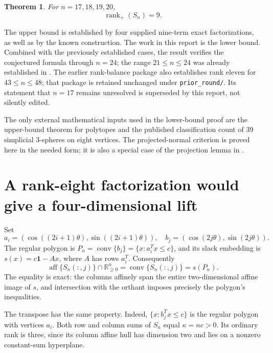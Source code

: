 \documentclass[11pt]{article}
\newtheorem{theorem}{Theorem}[section]
\theoremstyle{definition}
\newcommand{\rankp}{\operatorname{rank}_{+}}
\newcommand{\aff}{\operatorname{aff}}
\newcommand{\conv}{\operatorname{conv}}
\newcommand{\R}{\mathbb R}
\newcommand{\one}{\mathbf 1}
\begin{document}
\begin{theorem}\label{thm:main}
For $n=17,18,19,20$,
\[
 \boxed{\rankp(S_n)=9.}
\]
\end{theorem}
The upper bound is established by four supplied nine-term exact factorizations, as well as by the known construction. The work in this report is the lower bound. Combined with the previously established cases, the result verifies the conjectured formula through $n=24$; the range $21\le n\le24$ was already established in \cite{vgg}. The earlier rank-balance package also establishes rank eleven for $43\le n\le48$; that package is retained unchanged under \texttt{prior\_round/}. Its statement that $n=17$ remains unresolved is superseded by this report, not silently edited.

The only external mathematical inputs used in the lower-bound proof are the upper-bound theorem for polytopes and the published classification count of 39 simplicial 3-spheres on eight vertices. The projected-normal criterion is proved here in the needed form; it is also a special case of the projection lemma in \cite{rs}.

\section{A rank-eight factorization would give a four-dimensional lift}
Set
\[
 a_i=(\cos((2i+1)\theta),\sin((2i+1)\theta)),\quad
 b_j=(\cos(2j\theta),\sin(2j\theta)).
\]
The regular polygon is $P_n=\conv\{b_j\}=\{x:a_i^Tx\le c\}$, and its slack embedding is $s(x)=c\one-Ax$, where $A$ has rows $a_i^T$. Consequently
\begin{equation}\label{eq:section}
 \aff\{S_n(:,j)\}\cap\R^n_{\ge0}=\conv\{S_n(:,j)\}=s(P_n).
\end{equation}
The equality is exact: the columns affinely span the entire two-dimensional affine image of $s$, and intersection with the orthant imposes precisely the polygon's inequalities.

The transpose has the same property. Indeed, $\{x:b_j^Tx\le c\}$ is the regular polygon with vertices $a_i$. Both row and column sums of $S_n$ equal $\kappa=nc>0$. Its ordinary rank is three, since its column affine hull has dimension two and lies on a nonzero constant-sum hyperplane.
\end{document}
